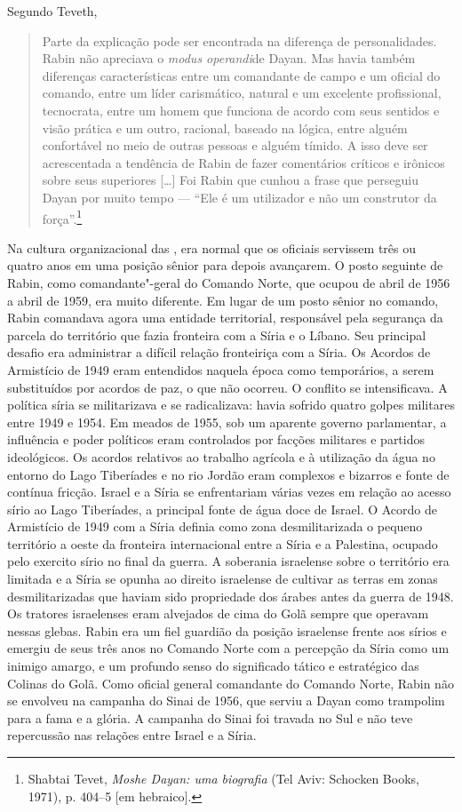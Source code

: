 Segundo Teveth,

\begin{quote}
Parte da explicação pode ser encontrada na diferença de personalidades.
Rabin não apreciava o \emph{modus operandi}de Dayan. Mas havia também
diferenças características entre um comandante de campo e um oficial do
comando, entre um líder carismático, natural e um excelente
profissional, tecnocrata, entre um homem que funciona de acordo com seus
sentidos e visão prática e um outro, racional, baseado na lógica, entre
alguém confortável no meio de outras pessoas e alguém tímido. A isso
deve ser acrescentada a tendência de Rabin de fazer comentários críticos
e irônicos sobre seus superiores {[}\ldots{}{]} Foi Rabin que cunhou a frase
que perseguiu Dayan por muito tempo --- ``Ele é um utilizador e não um
construtor da força''.\footnote{Shabtai Tevet, \emph{Moshe Dayan: uma biografia} (Tel Aviv: Schocken Books,
1971), p. 404--5 {[}em hebraico{]}.}
\end{quote}

Na cultura organizacional das , era normal que os oficiais servissem
três ou quatro anos em uma posição sênior para depois avançarem. O posto
seguinte de Rabin, como comandante"-geral do Comando Norte, que ocupou de
abril de 1956 a abril de 1959, era muito diferente. Em lugar de um posto
sênior no comando, Rabin comandava agora uma entidade territorial,
responsável pela segurança da parcela do território que fazia fronteira
com a Síria e o Líbano. Seu principal desafio era administrar a difícil
relação fronteiriça com a Síria. Os Acordos de Armistício de 1949 eram
entendidos naquela época como temporários, a serem substituídos por
acordos de paz, o que não ocorreu. O conflito se intensificava. A
política síria se militarizava e se radicalizava: havia sofrido quatro
golpes militares entre 1949 e 1954. Em meados de 1955, sob um aparente
governo parlamentar, a influência e poder políticos eram controlados por
facções militares e partidos ideológicos. Os acordos relativos ao
trabalho agrícola e à utilização da água no entorno do Lago Tiberíades e
no rio Jordão eram complexos e bizarros e fonte de contínua fricção.
Israel e a Síria se enfrentariam várias vezes em relação ao acesso sírio
ao Lago Tiberíades, a principal fonte de água doce de Israel. O Acordo
de Armistício de 1949 com a Síria definia como zona desmilitarizada o
pequeno território a oeste da fronteira internacional entre a Síria e a
Palestina, ocupado pelo exercito sírio no final da guerra. A soberania
israelense sobre o território era limitada e a Síria se opunha ao
direito israelense de cultivar as terras em zonas desmilitarizadas que
haviam sido propriedade dos árabes antes da guerra de 1948. Os tratores
israelenses eram alvejados de cima do Golã sempre que operavam
nessas glebas. Rabin era um fiel guardião da posição israelense frente
aos sírios e emergiu de seus três anos no Comando Norte com a percepção
da Síria como um inimigo amargo, e um profundo senso do significado
tático e estratégico das Colinas do Golã. Como oficial general
comandante do Comando Norte, Rabin não se envolveu na campanha do Sinai
de 1956, que serviu a Dayan como trampolim para a fama e a glória. A
campanha do Sinai foi travada no Sul e não teve repercussão nas relações
entre Israel e a Síria.

